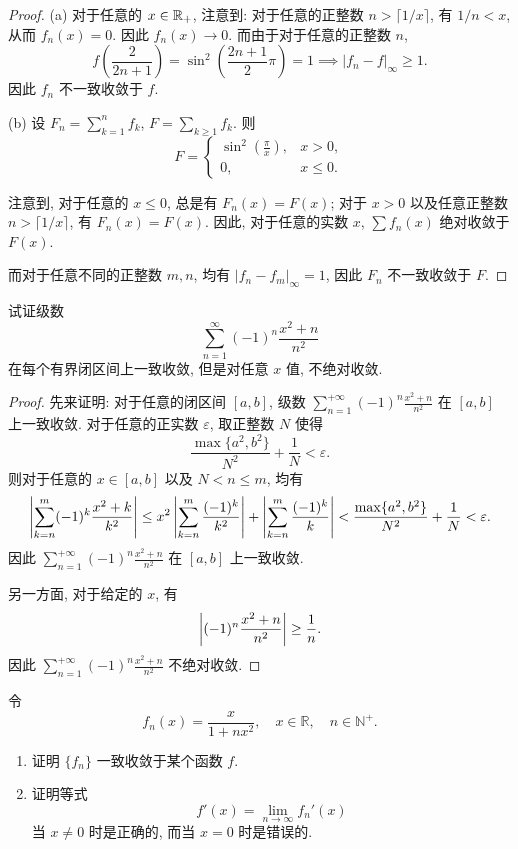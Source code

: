 \documentclass{article}
\begin{document}
\begin{proof}
  (a) 对于任意的 \( x\in\mathbb{R}_+ \), 注意到: 对于任意的正整数 \( n>\lceil 1/x \rceil \), 有 \( 1/n < x \), 从而 \( f_n(x)=0 \). 因此 \( f_n(x)\to 0 \). 而由于对于任意的正整数 \( n \), 
  \[ f\left( \frac{2}{2n+1} \right) = \sin^2\left( \frac{2n+1}{2} \pi \right) = 1 \implies |f_n-f|_{\infty} \geq 1. \]
  因此 \( f_n \) 不一致收敛于 \( f \).

  (b) 设 \( F_n = \sum_{k=1}^{n}f_k \), \( F = \sum_{k\ge 1}^{}f_k \). 则
  \[ F=\begin{cases}
    \sin^2\left( \frac{\pi}{x} \right), & x>0,\\
    0, & x \leq 0.
  \end{cases} \]

  注意到, 对于任意的 \( x \leq 0 \), 总是有 \( F_n(x)=F(x) \); 对于 \( x>0 \) 以及任意正整数 \( n>\lceil 1/x\rceil \), 有 \( F_n(x)=F(x) \). 因此, 对于任意的实数 \( x \), \( \sum f_n(x) \) 绝对收敛于 \( F(x) \). 
  
  而对于任意不同的正整数 \( m,n \), 均有 \( |f_n-f_m|_{\infty} = 1 \), 因此 \( F_n \) 不一致收敛于 \( F \).
\end{proof}



\begin{problem}
试证级数
\[
\sum_{n=1}^{\infty}(-1)^n\frac{x^2+n}{n^2}
\]
在每个有界闭区间上一致收敛, 但是对任意 $x$ 值, 不绝对收敛.
\end{problem}

\begin{proof}
  先来证明: 对于任意的闭区间 \( [a,b] \), 级数 \( \sum_{n=1}^{+\infty}(-1)^n\frac{x^2+n}{n^2} \) 在 \( [a,b] \) 上一致收敛. 对于任意的正实数 \( \varepsilon \), 取正整数 \( N \) 使得
  \[ \frac{\max\{a^2,b^2\}}{N^2} + \frac{1}{N} < \varepsilon. \]
  则对于任意的 \( x\in [a,b] \) 以及 \( N<n \leq m \), 均有
  \[ \left|\sum_{k=n}^{m}(-1)^k\frac{x^2+k}{k^2}\right| 
  \leq x^2 \left|\sum_{k=n}^{m}\frac{(-1)^k}{k^2}\right| + \left|\sum_{k=n}^{m}\frac{(-1)^k}{k}\right|
  <\frac{\max\{a^2,b^2\}}{N^2} + \frac{1}{N} 
  < \varepsilon.  \]
  因此 \( \sum_{n=1}^{+\infty}(-1)^n\frac{x^2+n}{n^2} \) 在 \( [a,b] \) 上一致收敛.

  另一方面, 对于给定的 \( x \), 有
  \[ \left|(-1)^n\frac{x^2+n}{n^2}\right| \geq \frac{1}{n}. \]
  因此 \( \sum_{n=1}^{+\infty}(-1)^n\frac{x^2+n}{n^2} \) 不绝对收敛.
\end{proof}



\begin{problem}
令
\[
f_n(x)=\frac{x}{1+n x^2},\quad x\in\mathbb{R},\quad n\in\mathbb{N}^+.
\]
\begin{enumerate}[label=(\alph*)]
\item 证明 $\{f_n\}$ 一致收敛于某个函数 $f$.
\item 证明等式
\[
f'(x)=\lim_{n\to\infty} f_n'(x)
\]
当 $x\ne 0$ 时是正确的, 而当 $x=0$ 时是错误的.
\end{enumerate}
\end{problem}
\end{document}
